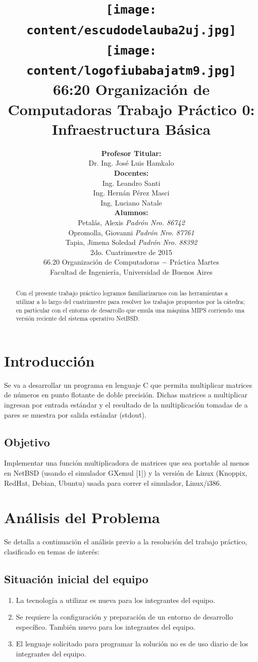 \documentclass[a4paper,10pt]{article}
\title{
\texttt{[image: content/escudodelauba2uj.jpg]}
\texttt{[image: content/logofiubabajatm9.jpg]}\\[2.5ex] 
\textbf{66:20 Organizaci\'on de Computadoras  
    Trabajo Pr\'actico 0: Infraestructura B\'asica
}
}
\author{
	\textbf{Profesor Titular:} \\ 
	Dr. Ing. Jos\'e Luis Hamkalo  \\[2.5ex] 
	\textbf{Docentes:} \\
	Ing. Leandro Santi  \\
	Ing. Hern\'an P\'erez Masci\\
    Ing. Luciano Natale\\[2.5ex]
	\textbf{Alumnos:}								\\ 
	Petalás, Alexis \textit{Padr\'on Nro. 86742}\\
    Opromolla, Giovanni \textit{Padr\'on Nro. 87761}				\\
    Tapia, Jimena Soledad \textit{Padr\'on Nro. 88392}				\\[2.5ex]
	\normalsize{2do. Cuatrimestre de 2015}									\\
	\normalsize{66.20 Organizaci\'on de Computadoras  $-$ Pr\'actica Martes}	\\
	\normalsize{Facultad de Ingenier\'ia, Universidad de Buenos Aires}		\\   
}
\date{}
\begin{document}
	\maketitle

\thispagestyle{empty}   %

\begin{abstract}
Con el presente trabajo pr\'actico logramos familiarizarnos con las herramientas a utilizar a lo largo del cuatrimestre para resolver los trabajos propuestos por la c\'atedra; en particular con el entorno de desarrollo que emula una m\'aquina MIPS corriendo una versi\'on reciente del sistema operativo NetBSD.

\end{abstract}

\newpage

%
\renewcommand{\contentsname}{Indice}
\tableofcontents
{}

\newpage

\section{Introducci\'on}
Se va a desarrollar un programa en lenguaje C que permita multiplicar matrices de n\'umeros en punto flotante de doble precisi\'on. Dichas matrices a multiplicar ingresan por entrada est\'andar y el resultado de la multiplicaci\'on tomadas de a pares se muestra por salida est\'andar (stdout).

\subsection{Objetivo}
Implementar una funci\'on multiplicadora de matrices que sea portable al menos en NetBSD (usando el simulador GXemul [1]) y la versi\'on de Linux (Knoppix, RedHat, Debian, Ubuntu) usada para correr el simulador, Linux/i386.

\newpage

\section{An\'alisis del Problema}
Se detalla a continuaci\'on el an\'alisis previo a la resoluci\'on del trabajo pr\'actico, clasificado en temas de inter\'es:

\subsection{Situaci\'on inicial del equipo}
\begin{enumerate}
\item La tecnolog\'ia a utilizar es nueva para los integrantes del equipo.
\item Se requiere la configuraci\'on y preparaci\'on de un entorno de desarrollo espec\'ifico. Tambi\'en nuevo para los integrantes del equipo.
\item El lenguaje solicitado para programar la soluci\'on no es de uso diario de los integrantes del equipo.
\end{enumerate}
\end{document}
